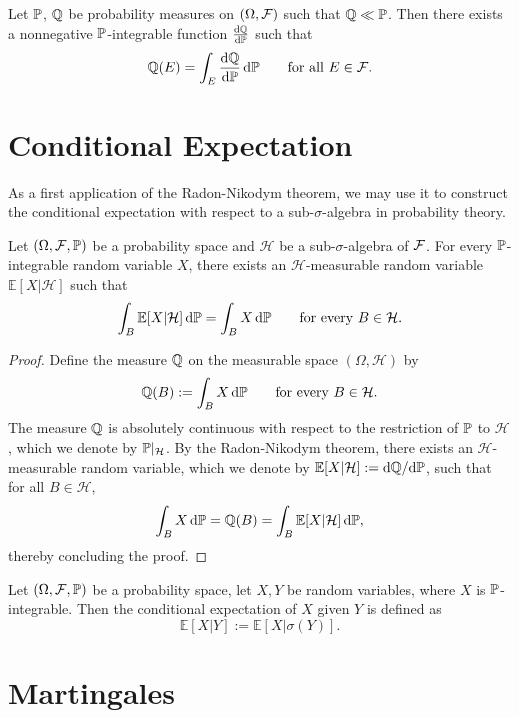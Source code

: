 \begin{theorem} 
	Let $\mathbb P$, $\mathbb Q$ be probability measures on $(\Omega,\mathcal F)$ such that $\mathbb Q\ll \mathbb P$. Then there exists a nonnegative $\mathbb P$-integrable function $\frac{\mathrm{d}\mathbb Q}{\mathrm{d}\mathbb P}$ such that
	\[
		\mathbb Q(E) = \int_E \frac{\mathrm{d}\mathbb Q}{\mathrm{d}\mathbb P}\,\mathrm{d}\mathbb P\qquad\text{for all $E\in\mathcal F$}.
	\]
\end{theorem}


\section{Conditional Expectation}

As a first application of the Radon-Nikodym theorem, we may use it to construct the conditional expectation with respect to a sub-$\sigma$-algebra in probability theory.

\begin{theorem}
Let $(\Omega, \mathcal F, \mathbb P)$ be a probability space and $\mathcal{H}$ be a sub-$\sigma$-algebra of $\mathcal F$. For every $\mathbb P$-integrable random variable $X$, there exists an $\mathcal{H}$-measurable random variable $\mathbb{E}[X|\mathcal{H}]$ such that
\[
\int_B \mathbb{E}[ X | \mathcal{H} ] \,\mathrm{d} \mathbb P = \int_B X\, \mathrm{d} \mathbb P\qquad\text{for every $B \in \mathcal{H}$}.
\]
\end{theorem}

\begin{proof}
Define the measure $\mathbb Q$ on the measurable space $(\Omega,\mathcal{H})$ by
\[
\mathbb Q(B) := \int_B X\, \mathrm{d} \mathbb P \qquad \text{for every  $B \in \mathcal{H}$}.
\]
The measure $\mathbb Q$ is absolutely continuous with respect to the restriction of $\mathbb P$ to $\mathcal{H}$, which we denote by $\mathbb P|_{\mathcal{H}}$.
By the Radon-Nikodym theorem, there exists an $\mathcal{H}$-measurable random variable, which we denote by $\mathbb{E}[X|\mathcal{H}] := \mathrm{d}\mathbb Q/\mathrm{d}\mathbb P$, such that for all $B \in \mathcal{H}$,
\[
\int_B X \,\mathrm{d} \mathbb P = \mathbb Q(B) = \int_B \mathbb{E}[X | \mathcal{H}] \,\mathrm{d} \mathbb P,
\]
thereby concluding the proof.
\end{proof}

\begin{definition}
Let $(\Omega, \mathcal F, \mathbb P)$ be a probability space, let $X,Y$ be random variables, where $X$ is $\mathbb P$-integrable. Then the conditional expectation of $X$ given $Y$ is defined as
\[
\mathbb{E}[X | Y] := \mathbb{E}[ X | \sigma(Y) ].
\]	
\end{definition}


\section{Martingales}

